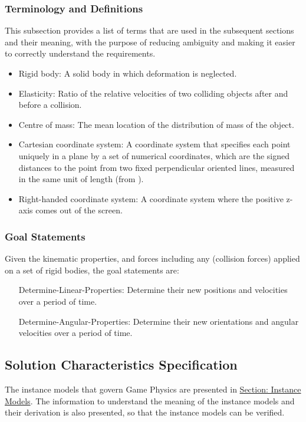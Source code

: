 \documentclass[12pt]{article}
\begin{document}
\subsubsection{Terminology and Definitions}
\label{Sec:TermDefs}
This subsection provides a list of terms that are used in the subsequent sections and their meaning, with the purpose of reducing ambiguity and making it easier to correctly understand the requirements.
\begin{itemize}
\item{Rigid body: A solid body in which deformation is neglected.}
\item{Elasticity: Ratio of the relative velocities of two colliding objects after and before a collision.}
\item{Centre of mass: The mean location of the distribution of mass of the object.}
\item{Cartesian coordinate system: A coordinate system that specifies each point uniquely in a plane by a set of numerical coordinates, which are the signed distances to the point from two fixed perpendicular oriented lines, measured in the same unit of length (from \cite{cartesianWiki}).}
\item{Right-handed coordinate system: A coordinate system where the positive z-axis comes out of the screen.}
\end{itemize}
\subsubsection{Goal Statements}
\label{Sec:GoalStmt}
Given the kinematic properties, and forces including any (collision forces) applied on a set of rigid bodies, the goal statements are:
\begin{itemize}
\item[Determine-Linear-Properties:\phantomsection\label{linearGS}]Determine their new positions and velocities over a period of time.
\item[Determine-Angular-Properties:\phantomsection\label{angularGS}]Determine their new orientations and angular velocities over a period of time.
\end{itemize}
\subsection{Solution Characteristics Specification}
\label{Sec:SolCharSpec}
The instance models that govern Game Physics are presented in \hyperref[Sec:IMs]{Section: Instance Models}. The information to understand the meaning of the instance models and their derivation is also presented, so that the instance models can be verified.
\end{document}
